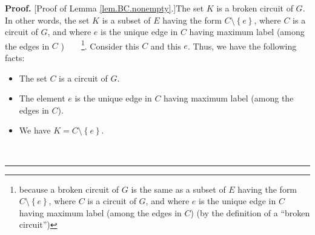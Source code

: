 \documentclass[numbers=enddot,12pt,final,onecolumn,notitlepage]{scrartcl}%
\theoremstyle{definition}
\newenvironment{proof}[1][Proof]{\noindent\textbf{#1.} }{\ \rule{0.5em}{0.5em}}
\newenvironment{verlong}{}{}
\begin{document}
\begin{verlong}
\begin{proof}
[Proof of Lemma \ref{lem.BC.nonempty}.]The set $K$ is a broken circuit of $G$.
In other words, the set $K$ is a subset of $E$ having the form $C\setminus
\left\{  e\right\}  $, where $C$ is a circuit of $G$, and where $e$ is the
unique edge in $C$ having maximum label (among the edges in $C$%
)\ \ \ \ \footnote{because a broken circuit of $G$ is the same as a subset of
$E$ having the form $C\setminus\left\{  e\right\}  $, where $C$ is a circuit
of $G$, and where $e$ is the unique edge in $C$ having maximum label (among
the edges in $C$) (by the definition of a \textquotedblleft broken
circuit\textquotedblright)}. Consider this $C$ and this $e$. Thus, we have the
following facts:

\begin{itemize}
\item The set $C$ is a circuit of $G$.

\item The element $e$ is the unique edge in $C$ having maximum label (among
the edges in $C$).

\item We have $K=C\setminus\left\{  e\right\}  $.
\end{itemize}


\end{proof}
\end{verlong}
\end{document}
